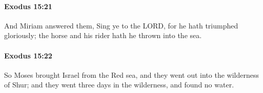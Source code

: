 		\paragraph{Exodus 15:21} %
			\label{EXODUS-15-21}

			And Miriam answered them, Sing ye to the LORD, for he hath triumphed gloriously; the horse and his rider hath he thrown into the sea.


		\paragraph{Exodus 15:22} %
			\label{EXODUS-15-22}

			So Moses brought Israel from the Red sea, and they went out into the wilderness of Shur; and they went three days in the wilderness, and found no water.


